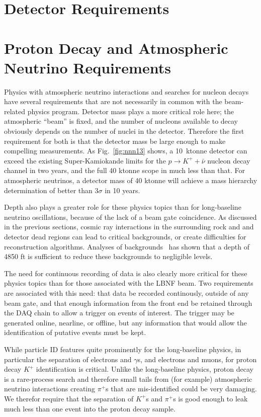 \section{Detector Requirements}
\label{sec:physics-atmpdk-detector-requirements}
\section{Proton Decay and Atmospheric Neutrino Requirements}

Physics with atmospheric neutrino interactions and searches for nucleon decays
have several requirements that are not necessarily in common with the
beam-related physics program.  Detector mass plays a more critical role here;
the atmospheric ``beam'' is fixed, and the number of nucleons available to
decay
obviously depends on the number of nuclei in the detector.  Therefore the first
requirement for both is that the detector mass be large enough to make
compelling measurements. As Fig.~\ref{fig:nnn13} shows, a 10~ktonne detector
can exceed the existing Super-Kamiokande limits for the $p\rightarrow K^+ +
\bar{\nu}$ nucleon decay channel in two years, and the full 40 ktonne scope in
much less than that.  For atmospheric neutrinos, a detector mass of 40 ktonne
will achieve a mass hierarchy determination of better than 3$\sigma$ in 10
years.

Depth also plays a greater role for these physics topics than for long-baseline
neutrino oscillations, because of the lack of a beam gate coincidence. As
discussed in the previous sections, cosmic ray interactions in the surrounding
rock and and detector dead regions can lead to critical backgrounds, or create
difficulties for reconstruction algorithms. Analyses of
backgrounds~\cite{bueno, klinger, sciopp} has shown that a depth of 4850 ft is
sufficient to reduce these backgrounds to negligible levels.

The need for continuous recording of data is also clearly more critical for
these physics topics than for those associated with the LBNF beam.  Two
requirements are associated with this need: that data be recorded continously,
outside of any beam gate, and that enough information from the front end be
retained through the DAQ chain to allow a trigger on events of interest. The
trigger may be generated online, nearline, or offline, but any information that
would allow the identification of putative events must be kept.

While particle ID features quite prominently for the long-baseline physics, in
particular the separation of electrons and $\gamma$s, and electrons and muons,
for proton decay $K^+$ identification is critical.  Unlike the long-baseline
physics, proton decay is a rare-process search and therefore small tails from
(for example) atmospheric neutrino interactions creating $\pi^+$s that are
mis-identified could be very damaging. We therefor require that the separation
of $K^+$s and $\pi^+$s is good enough to leak much less than one event into the
proton decay sample.

